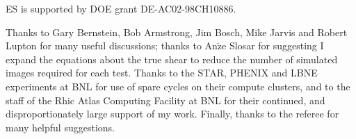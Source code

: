 \documentclass[usegraphicx,usenatbib]{mn2e}
\begin{document}
ES is supported by DOE grant DE-AC02-98CH10886.

Thanks to Gary Bernstein, Bob Armstrong, Jim Bosch, Mike Jarvis and Robert
Lupton for many useful discussions; thanks to An$\check{\textrm{z}}$e Slosar
for suggesting I expand the equations about the true shear to reduce the number
of simulated images required for each test.  Thanks to the STAR, PHENIX and
LBNE experiments at BNL for use of spare cycles on their compute clusters, and
to the staff of the Rhic Atlas Computing Facility at BNL for their continued,
and disproportionately large support of my work.  Finally, thanks to the
referee for many helpful suggestions.




\end{document}
